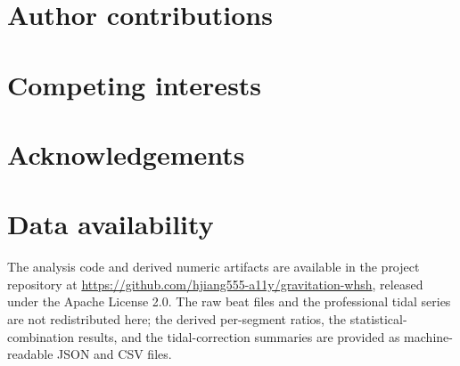 \documentclass[11pt,a4paper]{article}
\begin{document}
\section*{Author contributions}


\section*{Competing interests}


\section*{Acknowledgements}


\section*{Data availability}
The analysis code and derived numeric artifacts are available in the
project repository at
\url{https://github.com/hjiang555-a11y/gravitation-whsh}, released under the
Apache License 2.0. The raw beat files and the professional tidal series
are not redistributed here; the derived per-segment ratios, the
statistical-combination results, and the tidal-correction summaries are
provided as machine-readable JSON and CSV files.
\end{document}
